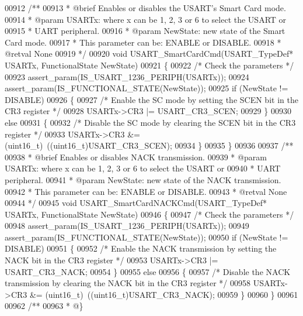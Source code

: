 \begin{DoxyCode}
00912 \textcolor{comment}{/**}
00913 \textcolor{comment}{  * @brief  Enables or disables the USART's Smart Card mode.}
00914 \textcolor{comment}{  * @param  USARTx: where x can be 1, 2, 3 or 6 to select the USART or }
00915 \textcolor{comment}{  *         UART peripheral.}
00916 \textcolor{comment}{  * @param  NewState: new state of the Smart Card mode.}
00917 \textcolor{comment}{  *          This parameter can be: ENABLE or DISABLE.      }
00918 \textcolor{comment}{  * @retval None}
00919 \textcolor{comment}{  */}
00920 \textcolor{keywordtype}{void} USART_SmartCardCmd(USART\_TypeDef* USARTx, FunctionalState NewState)
00921 \{
00922   \textcolor{comment}{/* Check the parameters */}
00923   assert_param(IS\_USART\_1236\_PERIPH(USARTx));
00924   assert_param(IS\_FUNCTIONAL\_STATE(NewState));
00925   \textcolor{keywordflow}{if} (NewState != DISABLE)
00926   \{
00927     \textcolor{comment}{/* Enable the SC mode by setting the SCEN bit in the CR3 register */}
00928     USARTx->CR3 |= USART_CR3_SCEN;
00929   \}
00930   \textcolor{keywordflow}{else}
00931   \{
00932     \textcolor{comment}{/* Disable the SC mode by clearing the SCEN bit in the CR3 register */}
00933     USARTx->CR3 &= (uint16\_t)~((uint16\_t)USART_CR3_SCEN);
00934   \}
00935 \}
00936 
00937 \textcolor{comment}{/**}
00938 \textcolor{comment}{  * @brief  Enables or disables NACK transmission.}
00939 \textcolor{comment}{  * @param  USARTx: where x can be 1, 2, 3 or 6 to select the USART or }
00940 \textcolor{comment}{  *         UART peripheral.}
00941 \textcolor{comment}{  * @param  NewState: new state of the NACK transmission.}
00942 \textcolor{comment}{  *          This parameter can be: ENABLE or DISABLE.  }
00943 \textcolor{comment}{  * @retval None}
00944 \textcolor{comment}{  */}
00945 \textcolor{keywordtype}{void} USART_SmartCardNACKCmd(USART\_TypeDef* USARTx, FunctionalState NewState)
00946 \{
00947   \textcolor{comment}{/* Check the parameters */}
00948   assert_param(IS\_USART\_1236\_PERIPH(USARTx));
00949   assert_param(IS\_FUNCTIONAL\_STATE(NewState));
00950   \textcolor{keywordflow}{if} (NewState != DISABLE)
00951   \{
00952     \textcolor{comment}{/* Enable the NACK transmission by setting the NACK bit in the CR3 register */}
00953     USARTx->CR3 |= USART_CR3_NACK;
00954   \}
00955   \textcolor{keywordflow}{else}
00956   \{
00957     \textcolor{comment}{/* Disable the NACK transmission by clearing the NACK bit in the CR3 register */}
00958     USARTx->CR3 &= (uint16\_t)~((uint16\_t)USART_CR3_NACK);
00959   \}
00960 \}
00961 
00962 \textcolor{comment}{/**}
00963 \textcolor{comment}{  * @\}}

\end{DoxyCode}
